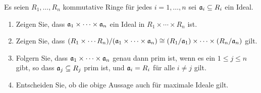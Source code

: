 \begin{question}[subtitle = Produkte von Idealen]
  \label{question: product of ideals is an ideal}
  Es seien $R_1, \dotsc, R_n$ kommutative Ringe für jedes $i = 1, \dotsc, n$ sei $\mathfrak{a}_i \subseteq R_i$ ein Ideal.
  \begin{enumerate}
    \item
      Zeigen Sie, dass $\mathfrak{a}_1 \times \dotsb \times \mathfrak{a}_n$ ein Ideal in $R_1 \times \dotsb \times R_n$ ist.
    \item
      Zeigen Sie, dass $(R_1 \times \dotsb R_n)/(\mathfrak{a}_1 \times \dotsb \times \mathfrak{a}_n) \cong (R_1/\mathfrak{a}_1) \times \dotsb \times (R_n/\mathfrak{a}_n)$ gilt.
    \item
      Folgern Sie, dass $\mathfrak{a}_1 \times \dotsb \times \mathfrak{a}_n$ genau dann prim ist, wenn es ein $1 \leq j \leq n$ gibt, so dass $\mathfrak{a}_j \subseteq R_j$ prim ist, und $\mathfrak{a}_i = R_i$ für alle $i \neq j$ gilt.
    \item
      Entscheiden Sie, ob die obige Aussage auch für maximale Ideale gilt.
  \end{enumerate}
\end{question}


